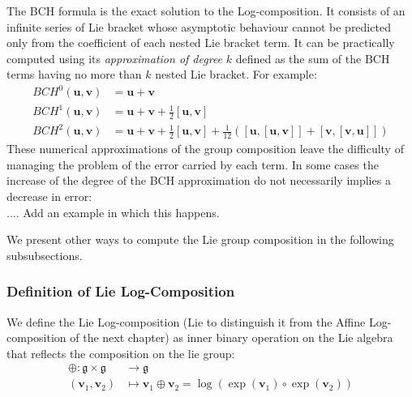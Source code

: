 

The BCH formula is the exact solution to the Log-composition. 
It consists of an infinite series of Lie bracket whose asymptotic behaviour cannot be predicted only from the coefficient of each nested Lie bracket term. It can be practically computed using its \emph{approximation of degree} $k$ defined as the sum of the BCH terms having no more than $k$ nested Lie bracket. For example:
\begin{align*}
	BCH^{0}(\mathbf{u},\mathbf{v}) &= \mathbf{u} + \mathbf{v} \\
	BCH^{1}(\mathbf{u},\mathbf{v}) &=  \mathbf{u} + \mathbf{v} + \frac{1}{2}[\mathbf{u},\mathbf{v}] \\
	BCH^{2}(\mathbf{u},\mathbf{v}) &=  \mathbf{u} + \mathbf{v} + \frac{1}{2}[\mathbf{u},\mathbf{v}] + \frac{1}{12}([\mathbf{u},[\mathbf{u},\mathbf{v}]] + [\mathbf{v},[\mathbf{v},\mathbf{u}]])
\end{align*}
These numerical approximations of the group composition leave the difficulty of managing the problem of the error carried by each term. In some cases the increase of the degree of the BCH approximation do not necessarily implies a decrease in error: \\
.... Add an example in which this happens.

We present other ways to compute the Lie group composition in the following subsubsections.



\subsubsection{Definition of Lie Log-Composition}

We define the Lie Log-composition (Lie to distinguish it from the Affine Log-composition of the next chapter) as inner binary operation on the Lie algebra that reflects the composition on the lie group:
\begin{align*}
\oplus : \mathfrak{g} \times \mathfrak{g} & \longrightarrow \mathfrak{g}    \\
(\mathbf{v}_{1}, \mathbf{v}_{2}) &\longmapsto \mathbf{v}_{1}\oplus \mathbf{v}_{2} =  \log(\exp(\mathbf{v}_1)\circ \exp(\mathbf{v}_2))
\end{align*}

